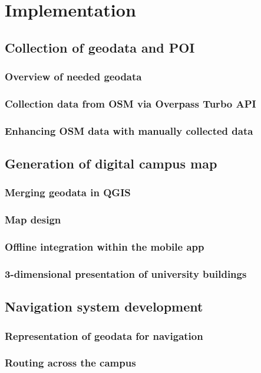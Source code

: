 \chapter{Implementation}
\label{cha:implementation}
\section{Collection of geodata and POI}
\subsection{Overview of needed geodata}
\subsection{Collection data from OSM via Overpass Turbo API}
\subsection{Enhancing OSM data with manually collected data}

\section{Generation of digital campus map}
\subsection{Merging geodata in QGIS}
\subsection{Map design}
\subsection{Offline integration within the mobile app}
\subsection{3-dimensional presentation of university buildings}

\section{Navigation system development}
\subsection{Representation of geodata for navigation}
\subsection{Routing across the campus}
